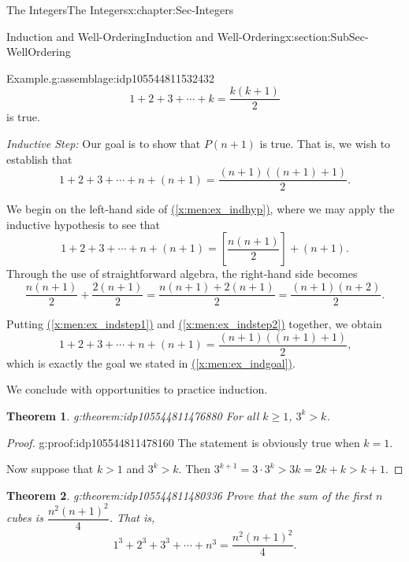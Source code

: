 \documentclass[oneside,10pt,]{book}
\newcommand{\xreffont}{\relax}
\numberwithin{equation}{section}
\renewcommand{\ge}{\geqslant}
\newtheorem{theorem}{Theorem}[section]
\begin{document}
\begin{chapterptx}{The Integers}{}{The Integers}{}{}{x:chapter:Sec-Integers}
\begin{sectionptx}{Induction and Well-Ordering}{}{Induction and Well-Ordering}{}{}{x:section:SubSec-WellOrdering}
\begin{assemblage}{Example.}{g:assemblage:idp105544811532432}
\begin{equation}
1+ 2 + 3 + \cdots + k = \frac{k(k+1)}{2}\label{x:men:ex_indhyp}
\end{equation}
is true.%
\par
\emph{Inductive Step:} Our goal is to show that \(P(n+1)\) is true. That is, we wish to establish that%
\begin{equation}
1+ 2 + 3 + \cdots + n + (n+1) = \frac{(n+1)((n+1)+1)}{2}\text{.}\label{x:men:ex_indgoal}
\end{equation}
%
\par
We begin on the left-hand side of \hyperref[x:men:ex_indhyp]{({\xreffont\ref{x:men:ex_indhyp}})}, where we may apply the inductive hypothesis to see that%
\begin{equation}
1+ 2 + 3 + \cdots + n + (n+1) = \left[\frac{n(n+1)}{2}\right] + (n+1)\text{.}\label{x:men:ex_indstep1}
\end{equation}
Through the use of straightforward algebra, the right-hand side becomes%
\begin{equation}
\frac{n(n+1)}{2} + \frac{2(n+1)}{2} = \frac{n(n+1) + 2(n+1)}{2} = \frac{(n+1)(n+2)}{2}\text{.}\label{x:men:ex_indstep2}
\end{equation}
%
\par
Putting \hyperref[x:men:ex_indstep1]{({\xreffont\ref{x:men:ex_indstep1}})} and \hyperref[x:men:ex_indstep2]{({\xreffont\ref{x:men:ex_indstep2}})} together, we obtain%
\begin{equation*}
1+ 2 + 3 + \cdots + n + (n+1) = \frac{(n+1)((n+1)+1)}{2}\text{,}
\end{equation*}
which is exactly the goal we stated in \hyperref[x:men:ex_indgoal]{({\xreffont\ref{x:men:ex_indgoal}})}.%
\end{assemblage}
We conclude with opportunities to practice induction.%
\begin{theorem}{}{}{g:theorem:idp105544811476880}%
For all \(k\ge 1\), \(3^k > k\).%
\end{theorem}
\begin{proof}{}{g:proof:idp105544811478160}
The statement is obviously true when \(k=1\).%
\par
Now suppose that \(k > 1\) and \(3^k > k\). Then \(3^{k+1} = 3\cdot 3^k > 3k = 2k + k > k+1\).%
\end{proof}
\begin{theorem}{}{}{g:theorem:idp105544811480336}%
Prove that the sum of the first \(n\) cubes is \(\dfrac{n^2(n+1)^2}{4}\). That is,%
%
\begin{equation*}
1^3 + 2^3 + 3^3 + \cdots + n^3 = \dfrac{n^2(n+1)^2}{4}.

\end{equation*}
\end{theorem}
\end{sectionptx}
\end{chapterptx}
\end{document}
